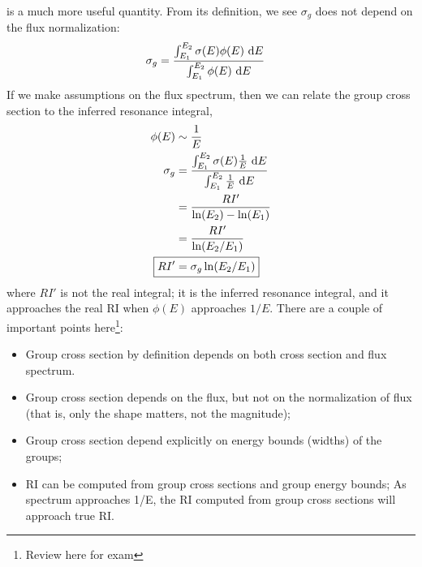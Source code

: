 \documentclass{school-22.211-notes}
\begin{document}
 is a much more useful quantity. From its definition, we see $\sigma_g$ does not depend on the flux normalization: 
\begin{align}
\sigma_g &= \frac{\int_{E_1}^{E_2} \sigma(E) \phi(E) \mbox{ }\mathrm{d} E }{\int_{E_1}^{E_2} \phi(E) \mbox{ }\mathrm{d} E} 
\end{align}
If we make assumptions on the flux spectrum, then we can relate the group cross section to the inferred resonance integral,
\begin{align}
\phi(E) &\sim \frac{1}{E} \\
\sigma_g &= \frac{\int_{E_1}^{E_2} \sigma(E) \frac{1}{E} \dE }{\int_{E_1}^{E_2} \frac{1}{E} \dE} \\
&= \frac{RI'}{\ln(E_2) - \ln(E_1)}  \\
&= \frac{RI'}{\ln(E_2/E_1)} \\
\Aboxed{ RI' &= \sigma_g \ln(E_2/E_1) }
\end{align}
where $RI'$ is not the real integral; it is the inferred resonance integral, and it approaches the real RI when $\phi(E)$ approaches $1/E$. There are a couple of important points here\footnote{Review here for exam}:
\begin{itemize}
\item Group cross section by definition depends on both cross section and flux spectrum. 
\item Group cross section depends on the flux, but not on the normalization of flux (that is, only the shape matters, not the magnitude);
\item Group cross section depend explicitly on energy bounds (widths) of the groups; 
\item RI can be computed from group cross sections and group energy bounds; As spectrum approaches 1/E, the RI computed from group cross sections will approach true RI. 
\end{itemize}
\end{document}
